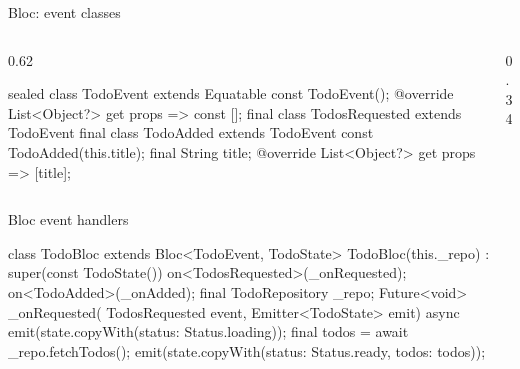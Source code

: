 \documentclass[10pt,aspectratio=169,t]{beamer}
\begin{document}
\begin{frame}[fragile,eyebrow=Bloc]{Bloc: event classes}
  \begin{columns}[T]
    \begin{column}{0.62\textwidth}
\begin{dart}
sealed class TodoEvent extends Equatable {
  const TodoEvent();
  @override
  List<Object?> get props => const [];
}
final class TodosRequested extends TodoEvent {}
final class TodoAdded extends TodoEvent {
  const TodoAdded(this.title);
  final String title;
  @override
  List<Object?> get props => [title];
}
\end{dart}
    \end{column}
    \begin{column}{0.34\textwidth}
    \end{column}
  \end{columns}
\end{frame}

\begin{frame}[fragile,eyebrow=Bloc]{Bloc event handlers}
\begin{dart}
class TodoBloc extends Bloc<TodoEvent, TodoState> {
  TodoBloc(this._repo) : super(const TodoState()) {
    on<TodosRequested>(_onRequested);
    on<TodoAdded>(_onAdded);
  }
  final TodoRepository _repo;
  Future<void> _onRequested(
      TodosRequested event, Emitter<TodoState> emit) async {
    emit(state.copyWith(status: Status.loading));
    final todos = await _repo.fetchTodos();
    emit(state.copyWith(status: Status.ready, todos: todos));
  }
}
\end{dart}
\end{frame}
\end{document}
